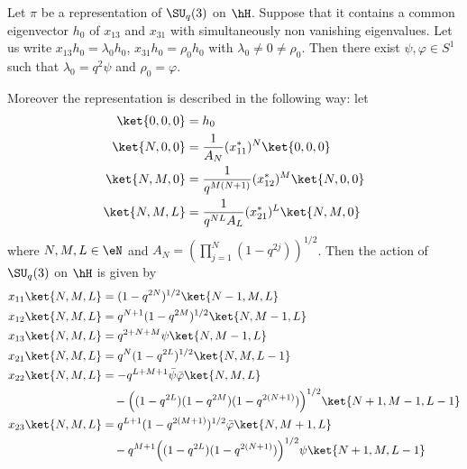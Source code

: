 \begin{theorem}     \label{ThoRepresSUqtnz}
	Let \( \pi\) be a representation of \( \SU_q(3)\) on \( \hH\). Suppose that it contains a common eigenvector \( h_0\) of \( x_{13}\) and \( x_{31}\) with simultaneously non vanishing eigenvalues. Let us write \( x_{13}h_0=\lambda_0h_0\), \( x_{31}h_0=\rho_0h_0\) with \( \lambda_0\neq 0\neq\rho_0\). Then there exist \( \psi, \varphi\in S^1\) such that \( \lambda_0=q^2\psi\) and \( \rho_0=\varphi\).

	Moreover the representation is described in the following way: let
	\begin{subequations}
		\begin{align}
			\ket{0,0,0} & =h_0                                           \\
			\ket{N,0,0} & =\frac{1}{ A_N }(x_{11}^*)^N\ket{0,0,0}        \\
			\ket{N,M,0} & =\frac{1}{ q^{M(N+1)} }(x_{12}^*)^M\ket{N,0,0} \\
			\ket{N,M,L} & =\frac{1}{ q^{NL}A_L }(x_{21}^*)^L\ket{N,M,0}
		\end{align}
	\end{subequations}
	where \( N,M,L\in\eN\) and \( A_N=\left( \prod_{j=1}^N(1-q^{2j})\right)^{1/2}\). Then the action of \( \SU_q(3)\) on \( \hH\) is given by
	\begin{subequations}
		\begin{align}
			x_{11}\ket{N,M,L} & =(1-q^{2N})^{1/2}\ket{N-1,M,L}        \label{subeqxijNMLa}                  \\
			x_{12}\ket{N,M,L} & =q^{N+1}(1-q^{2M})^{1/2}\ket{N,M-1,L}                                       \\
			x_{13}\ket{N,M,L} & =q^{2+N+M}\psi\ket{N,M-1,L}                                                 \\
			x_{21}\ket{N,M,L} & =q^N(1-q^{2L})^{1/2}\ket{N,M,L-1}                                           \\
			x_{22}\ket{N,M,L} & =-q^{L+M+1}\bar\psi\bar\varphi\ket{N,M,L}                                   \\
			                  & \quad-\Big( (1-q^{2L})(1-q^{2M})(1-q^{2(N+1)}) \Big)^{1/2}\ket{N+1,M-1,L-1} \\
			x_{23}\ket{N,M,L} & =q^{L+1}(1-q^{2(M+1)})^{1/2}\bar\varphi\ket{N,M+1,L}                        \\
			                  & \quad-q^{M+1}\Big( (1-q^{2L})(1-q^{2(N+1)}) \Big)^{1/2}\psi\ket{N+1,M,L-1}  \\

\end{align}
\end{subequations}
\end{theorem}
